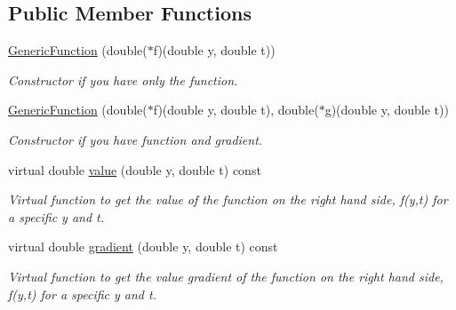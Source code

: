 \subsection*{Public Member Functions}
\begin{DoxyCompactItemize}
\item 
\hypertarget{class_generic_function_a74e9aaff47e0bba83c0d0ad3f60b1ec5}{}\hyperlink{class_generic_function_a74e9aaff47e0bba83c0d0ad3f60b1ec5}{Generic\+Function} (double($\ast$f)(double y, double t))\label{class_generic_function_a74e9aaff47e0bba83c0d0ad3f60b1ec5}

\begin{DoxyCompactList}\small\item\em Constructor if you have only the function. \end{DoxyCompactList}\item 
\hypertarget{class_generic_function_a251276ed4f9512a284257e3965a18207}{}\hyperlink{class_generic_function_a251276ed4f9512a284257e3965a18207}{Generic\+Function} (double($\ast$f)(double y, double t), double($\ast$g)(double y, double t))\label{class_generic_function_a251276ed4f9512a284257e3965a18207}

\begin{DoxyCompactList}\small\item\em Constructor if you have function and gradient. \end{DoxyCompactList}\item 
\hypertarget{class_generic_function_ab6ff4fd2c397f0d57c96903277037c7e}{}virtual double \hyperlink{class_generic_function_ab6ff4fd2c397f0d57c96903277037c7e}{value} (double y, double t) const \label{class_generic_function_ab6ff4fd2c397f0d57c96903277037c7e}

\begin{DoxyCompactList}\small\item\em Virtual function to get the value of the function on the right hand side, f(y,t) for a specific y and t. \end{DoxyCompactList}\item 
\hypertarget{class_generic_function_afe74d7deb46708999a9d01514589f16b}{}virtual double \hyperlink{class_generic_function_afe74d7deb46708999a9d01514589f16b}{gradient} (double y, double t) const \label{class_generic_function_afe74d7deb46708999a9d01514589f16b}

\begin{DoxyCompactList}\small\item\em Virtual function to get the value gradient of the function on the right hand side, f\textquotesingle{}(y,t) for a specific y and t. \end{DoxyCompactList}\end{DoxyCompactItemize}



